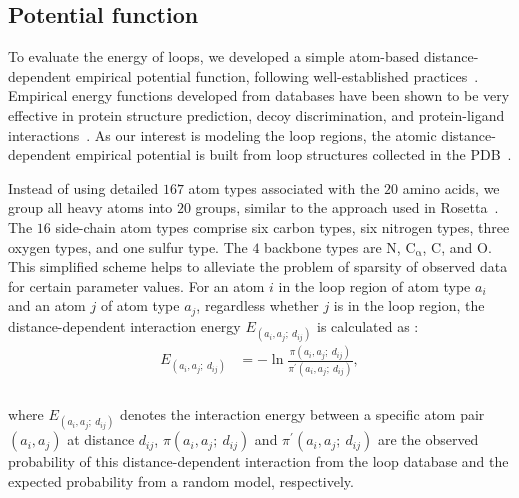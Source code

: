 \subsection*{Potential function}

To evaluate the energy of loops, we developed a simple atom-based
distance-dependent empirical potential function, following
well-established
practices~\cite{sippl1990,miyazawa1996,lu2001,zhou2002,li2003,hu2004,zhang2005,shen2006,li2007}.
Empirical energy functions developed from databases have been shown
to be very effective in protein structure prediction, decoy
discrimination, and protein-ligand
interactions~\cite{samudrala1998,li2003,zhang2004b,zhang2005,zhang2004c,huang2006,huang2011,zimmermann2011}.
As our interest is modeling the loop regions, the atomic
distance-dependent empirical potential is built from loop structures
collected in the PDB~\cite{bernstein1977}.

Instead of using detailed $167$ atom types associated with the $20$
amino acids, we group all heavy atoms into $20$ groups, similar to
the approach used in Rosetta~\cite{sheffler2010}. The $16$
side-chain atom types comprise six carbon types, six nitrogen types,
three oxygen types, and one sulfur type. The $4$ backbone types are
N, $\mathrm{C_{\alpha}}$, C, and O. This simplified scheme helps to
alleviate the problem of sparsity of observed data for certain
parameter values. For an atom $i$ in the loop region of atom type
$a_{i}$ and an atom $j$ of atom type $a_{j}$, regardless whether $j$
is in the loop region, the distance-dependent interaction energy
$E_{(a_{i},a_{j};\:d_{ij})}$ is calculated as :
\begin{equation}
\left. \begin{aligned}
  E_{(a_{i},a_{j};\:d_{ij})} &=
         -\ln\frac{\pi(a_{i},a_{j};\:d_{ij})}{\pi^{\prime}(a_{i},a_{j};\:d_{ij})},\\
  \end{aligned} \right.
\end{equation}\\
where $E_(a_{i},a_{j};\:d_{ij})$ denotes the interaction energy
between a specific atom pair $(a_{i},a_{j})$ at distance $d_{ij}$,
$\pi(a_{i},a_{j};\:d_{ij})$ and $\pi^{\prime}(a_{i},a_{j};\:d_{ij})$
are the observed probability of this distance-dependent interaction
from the loop database and the expected probability from a random
model, respectively.

